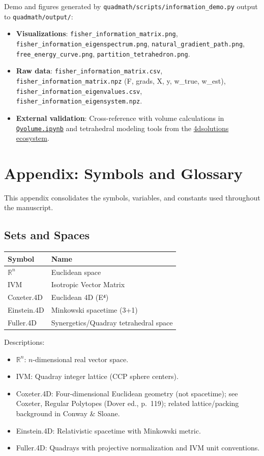 \documentclass[
  10pt,
]{article}
\providecommand{\tightlist}{%
  \setlength{\itemsep}{0pt}\setlength{\parskip}{0pt}}
\begin{document}
Demo and figures generated by
\texttt{quadmath/scripts/information\_demo.py} output to
\texttt{quadmath/output/}:

\begin{itemize}
\tightlist
\item
  \textbf{Visualizations}: \texttt{fisher\_information\_matrix.png},
  \texttt{fisher\_information\_eigenspectrum.png},
  \texttt{natural\_gradient\_path.png},
  \texttt{free\_energy\_curve.png}, \texttt{partition\_tetrahedron.png}.
\item
  \textbf{Raw data}: \texttt{fisher\_information\_matrix.csv},
  \texttt{fisher\_information\_matrix.npz} (F, grads, X, y, w\_true,
  w\_est), \texttt{fisher\_information\_eigenvalues.csv},
  \texttt{fisher\_information\_eigensystem.npz}.
\item
  \textbf{External validation}: Cross-reference with volume calculations
  in
  \href{https://github.com/4dsolutions/School_of_Tomorrow/blob/master/Qvolume.ipynb}{\texttt{Qvolume.ipynb}}
  and tetrahedral modeling tools from the
  \href{https://github.com/4dsolutions}{4dsolutions ecosystem}. 
\end{itemize}

\hypertarget{appendix-symbols-and-glossary}{%
\section{Appendix: Symbols and
Glossary}\label{appendix-symbols-and-glossary}}

This appendix consolidates the symbols, variables, and constants used
throughout the manuscript.

\hypertarget{sets-and-spaces}{%
\subsection{Sets and Spaces}\label{sets-and-spaces}}

\begin{longtable}[]{@{}ll@{}}
\toprule
Symbol & Name\tabularnewline
\midrule
\endhead
\(\mathbb{R}^n\) & Euclidean space\tabularnewline
IVM & Isotropic Vector Matrix\tabularnewline
Coxeter.4D & Euclidean 4D (E⁴)\tabularnewline
Einstein.4D & Minkowski spacetime (3+1)\tabularnewline
Fuller.4D & Synergetics/Quadray tetrahedral space\tabularnewline
\bottomrule
\end{longtable}

Descriptions:

\begin{itemize}
\tightlist
\item
  \(\mathbb{R}^n\): \(n\)-dimensional real vector space.
\item
  IVM: Quadray integer lattice (CCP sphere centers).
\item
  Coxeter.4D: Four-dimensional Euclidean geometry (not spacetime); see
  Coxeter, Regular Polytopes (Dover ed., p.~119); related
  lattice/packing background in Conway \& Sloane.
\item
  Einstein.4D: Relativistic spacetime with Minkowski metric.
\item
  Fuller.4D: Quadrays with projective normalization and IVM unit
  conventions.
\end{itemize}
\end{document}
